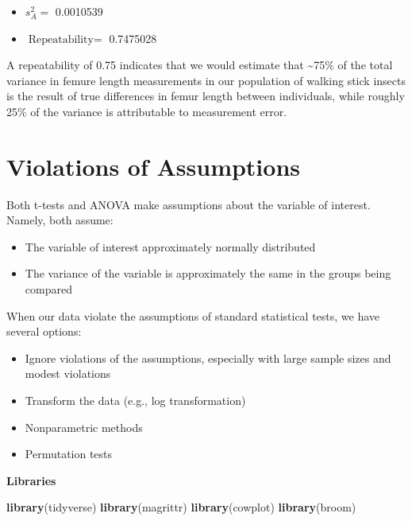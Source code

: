 \documentclass[]{book}
\newenvironment{Shaded}{\begin{snugshade}}{\end{snugshade}}
\newcommand{\KeywordTok}[1]{\textcolor[rgb]{0.13,0.29,0.53}{\textbf{#1}}}
\newcommand{\NormalTok}[1]{#1}
\providecommand{\tightlist}{%
  \setlength{\itemsep}{0pt}\setlength{\parskip}{0pt}}
\theoremstyle{definition}
\theoremstyle{definition}
\theoremstyle{definition}
\theoremstyle{remark}
\begin{document}
\begin{itemize}
\tightlist
\item
  \(s_A^2 =\) 0.0010539
\item
  \(\text{Repeatability} =\) 0.7475028
\end{itemize}

A repeatability of 0.75 indicates that we would estimate that
\textasciitilde{}75\% of the total variance in femure length
measurements in our population of walking stick insects is the result of
true differences in femur length between individuals, while roughly 25\%
of the variance is attributable to measurement error.

\hypertarget{violations-of-assumptions}{%
\chapter{Violations of Assumptions}\label{violations-of-assumptions}}

Both t-tests and ANOVA make assumptions about the variable of interest.
Namely, both assume:

\begin{itemize}
\tightlist
\item
  The variable of interest approximately normally distributed
\item
  The variance of the variable is approximately the same in the groups
  being compared
\end{itemize}

When our data violate the assumptions of standard statistical tests, we
have several options:

\begin{itemize}
\tightlist
\item
  Ignore violations of the assumptions, especially with large sample
  sizes and modest violations
\item
  Transform the data (e.g., log transformation)
\item
  Nonparametric methods
\item
  Permutation tests
\end{itemize}

\textbf{Libraries}

\begin{Shaded}
\begin{Highlighting}[]
\KeywordTok{library}\NormalTok{(tidyverse)}
\KeywordTok{library}\NormalTok{(magrittr)}
\KeywordTok{library}\NormalTok{(cowplot)}
\KeywordTok{library}\NormalTok{(broom)}
\end{Highlighting}
\end{Shaded}
\end{document}
